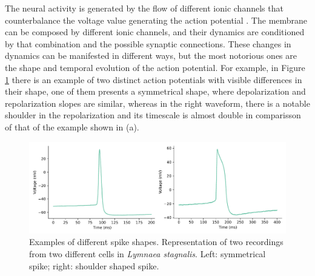 The neural activity is generated by the flow of different ionic channels that counterbalance the voltage value generating the action potential \parencite{koch99}. The membrane can be composed by different ionic channels, and their dynamics are conditioned by that combination and the possible synaptic connections. These changes in dynamics can be manifested in different ways, but the most notorious ones are the shape and temporal evolution of the action potential. %
For example, in Figure \ref{fig:spike-types} there is an example of two distinct action potentials with visible differences in their shape, one of them presents a symmetrical shape, where depolarization and repolarization slopes are similar, whereas in the right waveform, there is a notable shoulder in the repolarization and its timescale is almost double in comparisson of that of the example shown in (a).

\begin{figure}[htb!]
    \centering
    \includegraphics[width=\linewidth]{img/intro/spike-types.pdf}
    \caption{Examples of different spike shapes. Representation of two recordings from two different cells in \textit{Lymnaea stagnalis}. Left: symmetrical spike; right: shoulder shaped spike.}
    \label{fig:spike-types}
\end{figure}


